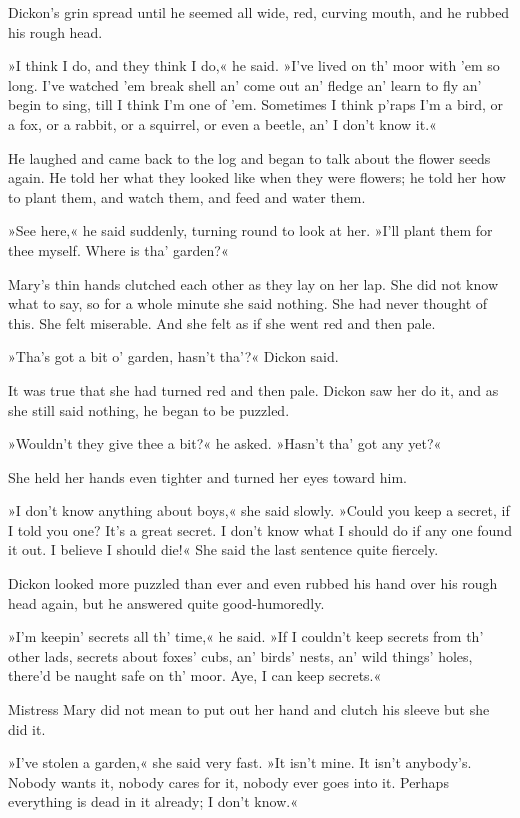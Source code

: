 Dickon's grin spread until he seemed all wide, red, curving mouth, and he rubbed his rough head.

»I think I do, and they think I do,« he said. »I've lived on th' moor with 'em so long. I've watched 'em break shell an' come out an' fledge an' learn to fly an' begin to sing, till I think I'm one of 'em. Sometimes I think p'raps I'm a bird, or a fox, or a rabbit, or a squirrel, or even a beetle, an' I don't know it.«

He laughed and came back to the log and began to talk about the flower seeds again. He told her what they looked like when they were flowers; he told her how to plant them, and watch them, and feed and water them.

»See here,« he said suddenly, turning round to look at her. »I'll plant them for thee myself. Where is tha' garden?«

Mary's thin hands clutched each other as they lay on her lap. She did not know what to say, so for a whole minute she said nothing. She had never thought of this. She felt miserable. And she felt as if she went red and then pale.

»Tha's got a bit o' garden, hasn't tha'?« Dickon said.

It was true that she had turned red and then pale. Dickon saw her do it, and as she still said nothing, he began to be puzzled.

»Wouldn't they give thee a bit?« he asked. »Hasn't tha' got any yet?«

She held her hands even tighter and turned her eyes toward him.

»I don't know anything about boys,« she said slowly. »Could you keep a secret, if I told you one? It's a great secret. I don't know what I should do if any one found it out. I believe I should die!« She said the last sentence quite fiercely.

Dickon looked more puzzled than ever and even rubbed his hand over his rough head again, but he answered quite good-humoredly.

»I'm keepin' secrets all th' time,« he said. »If I couldn't keep secrets from th' other lads, secrets about foxes' cubs, an' birds' nests, an' wild things' holes, there'd be naught safe on th' moor. Aye, I can keep secrets.«

Mistress Mary did not mean to put out her hand and clutch his sleeve but she did it.

»I've stolen a garden,« she said very fast. »It isn't mine. It isn't anybody's. Nobody wants it, nobody cares for it, nobody ever goes into it. Perhaps everything is dead in it already; I don't know.«

